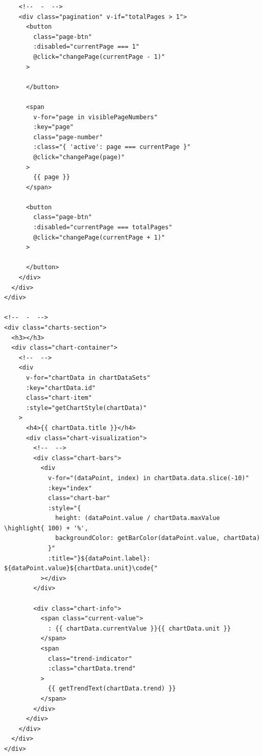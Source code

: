 \begin{verbatim}
    <!--  -  -->
    <div class="pagination" v-if="totalPages > 1">
      <button 
        class="page-btn"
        :disabled="currentPage === 1"
        @click="changePage(currentPage - 1)"
      >
        
      </button>
      
      <span 
        v-for="page in visiblePageNumbers" 
        :key="page"
        class="page-number"
        :class="{ 'active': page === currentPage }"
        @click="changePage(page)"
      >
        {{ page }}
      </span>
      
      <button 
        class="page-btn"
        :disabled="currentPage === totalPages"
        @click="changePage(currentPage + 1)"
      >
        
      </button>
    </div>
  </div>
</div>

<!--  -  -->
<div class="charts-section">
  <h3></h3>
  <div class="chart-container">
    <!--  -->
    <div 
      v-for="chartData in chartDataSets" 
      :key="chartData.id"
      class="chart-item"
      :style="getChartStyle(chartData)"
    >
      <h4>{{ chartData.title }}</h4>
      <div class="chart-visualization">
        <!--  -->
        <div class="chart-bars">
          <div 
            v-for="(dataPoint, index) in chartData.data.slice(-10)"
            :key="index"
            class="chart-bar"
            :style="{ 
              height: (dataPoint.value / chartData.maxValue \highlight{ 100) + '%',
              backgroundColor: getBarColor(dataPoint.value, chartData)
            }"
            :title="}${dataPoint.label}: ${dataPoint.value}${chartData.unit}\code{"
          ></div>
        </div>
        
        <div class="chart-info">
          <span class="current-value">
            : {{ chartData.currentValue }}{{ chartData.unit }}
          </span>
          <span 
            class="trend-indicator"
            :class="chartData.trend"
          >
            {{ getTrendText(chartData.trend) }}
          </span>
        </div>
      </div>
    </div>
  </div>
</div>
\end{verbatim}

